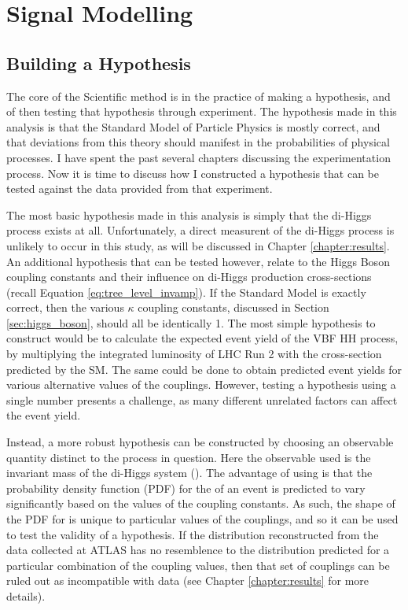 \chapter{Signal Modelling}


\section{Building a Hypothesis}

    The core of the Scientific method is in the practice of making a hypothesis, and of then testing that hypothesis through experiment.
    The hypothesis made in this analysis is that the Standard Model of Particle Physics is mostly correct,
        and that deviations from this theory should manifest in the probabilities of physical processes.
    I have spent the past several chapters discussing the experimentation process.
    Now it is time to discuss how I constructed a hypothesis that can be tested against the data provided from that experiment.

    The most basic hypothesis made in this analysis is simply that the di-Higgs process exists at all.
    Unfortunately, a direct measurent of the di-Higgs process is unlikely to occur in this study, as will be discussed in Chapter \ref{chapter:results}.
    An additional hypothesis that can be tested however,
        relate to the Higgs Boson coupling constants and their influence on di-Higgs production cross-sections
        (recall Equation \ref{eq:tree_level_invamp}).
    If the Standard Model is exactly correct, then the various $\kappa$ coupling constants,
        discussed in Section \ref{sec:higgs_boson},
        should all be identically 1.
    The most simple hypothesis to construct would be to calculate the expected event yield of the VBF \to HH process,
        by multiplying the integrated luminosity of LHC Run 2 with the cross-section predicted by the SM.
    The same could be done to obtain predicted event yields for various alternative values of the couplings.
    However, testing a hypothesis using a single number presents a challenge, as many different unrelated factors can affect the event yield.

    Instead, a more robust hypothesis can be constructed by choosing an observable quantity distinct to the process in question.
    Here the observable used is the invariant mass of the di-Higgs system (\mhh).
    The advantage of using \mhh is that the probability density function (PDF) for the \mhh of an event
        is predicted to vary significantly based on the values of the \kappa coupling constants.
    As such, the shape of the PDF for \mhh is unique to particular values of the couplings, 
        and so it can be used to test the validity of a hypothesis.
    If the \mhh distribution reconstructed from the data collected at ATLAS has no resemblence to
        the \mhh distribution predicted for a particular combination of the coupling values,
        then that set of couplings can be ruled out as incompatible with data
        (see Chapter \ref{chapter:results} for more details).

